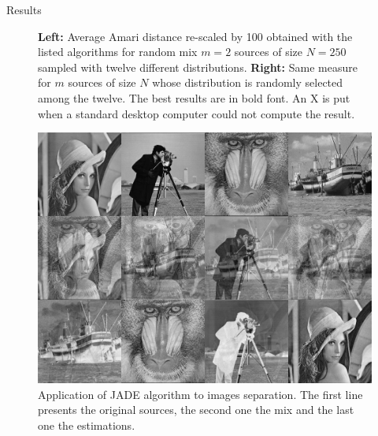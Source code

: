 \documentclass{beamer}
\begin{document}
\begin{frame}{}
\begin{columns}[T]
\begin{column}{.48\linewidth}

%
%


\begin{block}{Results}

\begin{figure}
\label{distres}
\centering
\resizebox{\textwidth}{!}{

}
\caption{\textbf{Left:} Average Amari distance re-scaled by 100 obtained with the listed algorithms for random mix $m=2$ sources of size $N=250$ sampled with twelve different distributions. \textbf{Right:} Same measure for $m$ sources of size $N$ whose distribution is randomly selected among the twelve. The best results are in bold font. An X is put when a standard desktop computer could not compute the result.}
\end{figure}

\begin{figure}
\label{imres}
\centering
\includegraphics[width=16cm]{../../image_test/unmix4.png}
\caption{Application of JADE algorithm to images separation. The first line presents the original sources, the second one the mix and the last one the estimations.}
\end{figure}
\end{block}


\end{column}
\end{columns}
\end{frame}
\end{document}
